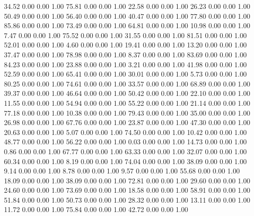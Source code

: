    34.52   0.00   0.00   1.00
   75.81   0.00   0.00   1.00
   22.58   0.00   0.00   1.00
   26.23   0.00   0.00   1.00
   50.49   0.00   0.00   1.00
   56.40   0.00   0.00   1.00
   40.47   0.00   0.00   1.00
   77.80   0.00   0.00   1.00
   85.86   0.00   0.00   1.00
   73.49   0.00   0.00   1.00
   64.81   0.00   0.00   1.00
   10.98   0.00   0.00   1.00
    7.47   0.00   0.00   1.00
   75.52   0.00   0.00   1.00
   31.55   0.00   0.00   1.00
   81.51   0.00   0.00   1.00
   52.01   0.00   0.00   1.00
    4.60   0.00   0.00   1.00
   19.41   0.00   0.00   1.00
   13.20   0.00   0.00   1.00
   37.47   0.00   0.00   1.00
   78.98   0.00   0.00   1.00
    8.37   0.00   0.00   1.00
   83.69   0.00   0.00   1.00
   84.23   0.00   0.00   1.00
   23.88   0.00   0.00   1.00
    3.21   0.00   0.00   1.00
   41.98   0.00   0.00   1.00
   52.59   0.00   0.00   1.00
   65.41   0.00   0.00   1.00
   30.01   0.00   0.00   1.00
    5.73   0.00   0.00   1.00
   80.25   0.00   0.00   1.00
   74.61   0.00   0.00   1.00
   33.57   0.00   0.00   1.00
   68.89   0.00   0.00   1.00
   39.37   0.00   0.00   1.00
   46.64   0.00   0.00   1.00
   50.42   0.00   0.00   1.00
   22.10   0.00   0.00   1.00
   11.55   0.00   0.00   1.00
   54.94   0.00   0.00   1.00
   55.22   0.00   0.00   1.00
   21.14   0.00   0.00   1.00
   77.18   0.00   0.00   1.00
   10.38   0.00   0.00   1.00
   79.43   0.00   0.00   1.00
   35.00   0.00   0.00   1.00
   26.98   0.00   0.00   1.00
   67.76   0.00   0.00   1.00
   23.87   0.00   0.00   1.00
   47.30   0.00   0.00   1.00
   20.63   0.00   0.00   1.00
    5.07   0.00   0.00   1.00
   74.50   0.00   0.00   1.00
   10.42   0.00   0.00   1.00
   48.77   0.00   0.00   1.00
   56.22   0.00   0.00   1.00
    0.03   0.00   0.00   1.00
   14.73   0.00   0.00   1.00
    0.86   0.00   0.00   1.00
   67.77   0.00   0.00   1.00
   63.33   0.00   0.00   1.00
   32.07   0.00   0.00   1.00
   60.34   0.00   0.00   1.00
    8.19   0.00   0.00   1.00
   74.04   0.00   0.00   1.00
   38.09   0.00   0.00   1.00
    9.14   0.00   0.00   1.00
    8.78   0.00   0.00   1.00
    9.57   0.00   0.00   1.00
   55.68   0.00   0.00   1.00
   18.09   0.00   0.00   1.00
   38.09   0.00   0.00   1.00
   72.81   0.00   0.00   1.00
   29.60   0.00   0.00   1.00
   24.60   0.00   0.00   1.00
   73.69   0.00   0.00   1.00
   18.58   0.00   0.00   1.00
   58.91   0.00   0.00   1.00
   51.84   0.00   0.00   1.00
   50.73   0.00   0.00   1.00
   28.32   0.00   0.00   1.00
   13.11   0.00   0.00   1.00
   11.72   0.00   0.00   1.00
   75.84   0.00   0.00   1.00
   42.72   0.00   0.00   1.00
